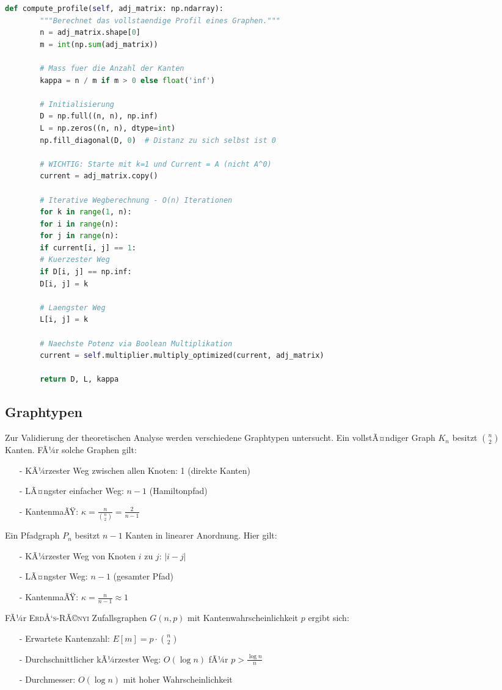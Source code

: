 ﻿\documentclass[a4paper,12pt]{article}
\theoremstyle{definition}
\begin{document}
	\begin{lstlisting}[language=Python, caption=Profilberechnung mit Signaturen, label=lst:cp]
		def compute_profile(self, adj_matrix: np.ndarray):
		"""Berechnet das vollstaendige Profil eines Graphen."""
		n = adj_matrix.shape[0]
		m = int(np.sum(adj_matrix))
		
		# Mass fuer die Anzahl der Kanten
		kappa = n / m if m > 0 else float('inf')
		
		# Initialisierung
		D = np.full((n, n), np.inf)
		L = np.zeros((n, n), dtype=int)
		np.fill_diagonal(D, 0)  # Distanz zu sich selbst ist 0
		
		# WICHTIG: Starte mit k=1 und Current = A (nicht A^0)
		current = adj_matrix.copy()
		
		# Iterative Wegberechnung - O(n) Iterationen
		for k in range(1, n):
		for i in range(n):
		for j in range(n):
		if current[i, j] == 1:
		# Kuerzester Weg
		if D[i, j] == np.inf:
		D[i, j] = k
		
		# Laengster Weg
		L[i, j] = k
		
		# Naechste Potenz via Boolean Multiplikation
		current = self.multiplier.multiply_optimized(current, adj_matrix)
		
		return D, L, kappa
	\end{lstlisting}
	
	\subsection{Graphtypen}
	
	Zur Validierung der theoretischen Analyse werden verschiedene Graphtypen untersucht. Ein vollstÃ¤ndiger Graph $K_n$ besitzt $\binom{n}{2}$ Kanten. FÃ¼r solche Graphen gilt:
	\begin{itemize}
		\item[-] KÃ¼rzester Weg zwischen allen Knoten: 1 (direkte Kanten)
		\item[-] LÃ¤ngster einfacher Weg: $n-1$ (Hamiltonpfad)
		\item[-] KantenmaÃŸ: $\kappa = \frac{n}{\binom{n}{2}} = \frac{2}{n-1}$
	\end{itemize}
	Ein Pfadgraph $P_n$ besitzt $n-1$ Kanten in linearer Anordnung. Hier gilt:
	\begin{itemize}
		\item[-] KÃ¼rzester Weg von Knoten $i$ zu $j$: $|i-j|$
		\item[-] LÃ¤ngster Weg: $n-1$ (gesamter Pfad)
		\item[-] KantenmaÃŸ: $\kappa = \frac{n}{n-1} \approx 1$
	\end{itemize}
	FÃ¼r \textsc{ErdÅ‘s-RÃ©nyi} Zufallsgraphen $G(n,p)$ mit Kantenwahrscheinlichkeit $p$ ergibt sich:
	\begin{itemize}
		\item[-] Erwartete Kantenzahl: $E[m] = p \cdot \binom{n}{2}$
		\item[-] Durchschnittlicher kÃ¼rzester Weg: $O(\log n)$ fÃ¼r $p > \frac{\log n}{n}$
		\item[-] Durchmesser: $O(\log n)$ mit hoher Wahrscheinlichkeit
	\end{itemize}
	
\end{document}
